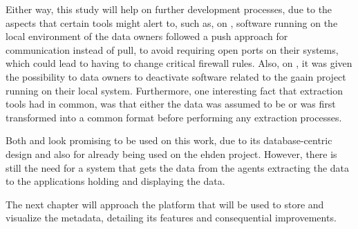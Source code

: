 Either way, this study will help on further development processes, due to the aspects that certain tools might alert to, such as, on \cite{popmednet}, software running on the local environment of the data owners followed a push approach for communication instead of pull, to avoid requiring open ports on their systems, which could lead to having to change critical firewall rules.
Also, on \cite{gaain}, it was given the possibility to data owners to deactivate software related to the \gls{gaain} project running on their local system.
Furthermore, one interesting fact that extraction tools had in common, was that either the data was assumed to be or was first transformed into a common format before performing any extraction processes.

Both \cite{montra} and \cite{achilles-github} look promising to be used on this work, due to its database-centric design and also for already being used on the \gls{ehden} project.
However, there is still the need for a system that gets the data from the agents extracting the data to the applications holding and displaying the data.

The next chapter will approach the platform that will be used to store and visualize the metadata, detailing its features and consequential improvements.
